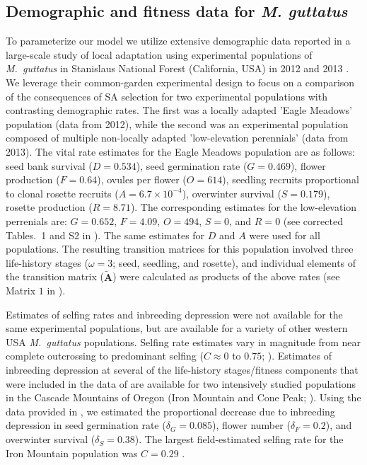 \documentclass[11pt]{article}
\def\mbf#1{\mathbf{#1}}
\begin{document}
\subsection*{Demographic and fitness data for {\itshape M. guttatus}} \label{subsec:MguttMethods}
To parameterize our model we utilize extensive demographic data reported in a large-scale study of local adaptation using experimental populations of {\itshape M.~guttatus} in Stanislaus National Forest (California, USA) in 2012 and 2013 \citep{PetersonEtAl2016}. We leverage their common-garden experimental design to focus on a comparison of the consequences of SA selection for two experimental populations with contrasting demographic rates. The first was a locally adapted 'Eagle Meadows' population (data from 2012), while the second was an experimental population composed of multiple non-locally adapted 'low-elevation perennials' (data from 2013). The vital rate estimates for the Eagle Meadows population are as follows: seed bank survival ($D = 0.534$), seed germination rate ($G = 0.469$), flower production ($F = 0.64$), ovules per flower ($O = 614$), seedling recruits proportional to clonal rosette recruits ($A = 6.7 \times 10^{-4}$), overwinter survival ($S = 0.179$), rosette production ($R = 8.71$). The corresponding estimates for the low-elevation perrenials are: $G = 0.652$, $F = 4.09$, $O = 494$, $S = 0$, and $R = 0$ (see corrected Tables.~1 and S2 in \citealt{PetersonEtAl2017}). The same estimates for $D$ and $A$ were used for all populations. The resulting transition matrices for this population involved three life-history stages ($\omega = 3$; seed, seedling, and rosette), and individual elements of the transition matrix ($\tilde{\mbf{A}}$) were calculated as products of the above rates (see Matrix $1$ in \citealt{PetersonEtAl2016}).

Estimates of selfing rates and inbreeding depression were not available for the same experimental populations, but are available for a variety of other western USA {\itshape M.~guttatus} populations. Selfing rate estimates vary in magnitude from near complete outcrossing to predominant selfing ($C \approx 0$ to $0.75$; \citealt{RitlandGanders1987, Ritland1990, Willis1999b}). Estimates of inbreeding depression at several of the life-history stages/fitness components that were included in the data of \citet{PetersonEtAl2016} are available for two intensively studied populations in the Cascade Mountains of Oregon (Iron Mountain and Cone Peak; \citealt{Willis1993, Willis1999a, Willis1999b}). Using the data provided in \citet{Willis1993}, we estimated the proportional decrease due to inbreeding depression in seed germination rate ($\delta_{G} = 0.085$), flower number ($\delta_{F} = 0.2$), and overwinter survival ($\delta_{S} = 0.38$). The largest field-estimated selfing rate for the Iron Mountain population was $C = 0.29$ \citep{Willis1993}.
\end{document}
